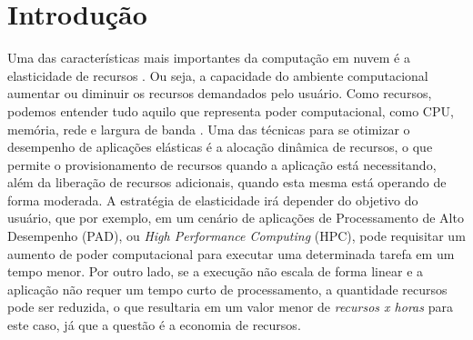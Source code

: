 \documentclass[twoside,english,brazilian]{UNISINOSartigo}
\begin{document}
%

%


\section{Introdução}

Uma das características mais importantes da computação em nuvem é a elasticidade de recursos \cite{Mell2012,Mauch20131408}. Ou seja, a capacidade do ambiente computacional aumentar ou diminuir os recursos demandados pelo usuário. Como recursos, podemos entender tudo aquilo que representa poder computacional, como CPU, memória, rede e largura de banda \cite{Kominos2017}. Uma das técnicas para se otimizar o desempenho de aplicações elásticas é a alocação dinâmica de recursos, o que permite o provisionamento de recursos quando a aplicação está necessitando, além da liberação de recursos adicionais, quando esta mesma está operando de forma moderada. A estratégia de elasticidade irá depender do objetivo do usuário, que por exemplo, em um cenário de aplicações de Processamento de Alto Desempenho (PAD), ou \textit{High Performance Computing} (HPC), pode requisitar um aumento de poder computacional para executar uma determinada tarefa em um tempo menor. Por outro lado, se a execução não escala de forma linear e a aplicação não requer um tempo curto de processamento, a quantidade recursos pode ser reduzida, o que resultaria em um valor menor de \textit{recursos x horas} para este caso, já que a questão é a economia de recursos.
\end{document}
